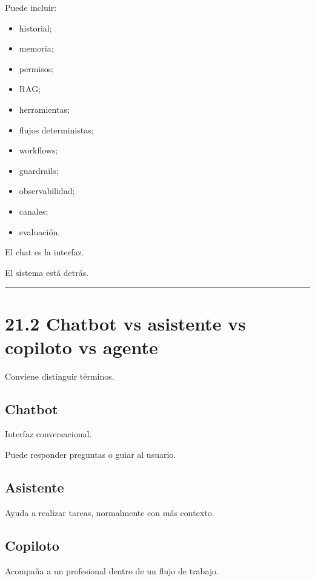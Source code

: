 Puede incluir:

\begin{itemize}
\tightlist
\item
  historial;
\item
  memoria;
\item
  permisos;
\item
  RAG;
\item
  herramientas;
\item
  flujos deterministas;
\item
  workflows;
\item
  guardrails;
\item
  observabilidad;
\item
  canales;
\item
  evaluación.
\end{itemize}

El chat es la interfaz.

El sistema está detrás.

\begin{center}\rule{0.5\linewidth}{0.5pt}\end{center}

\section{21.2 Chatbot vs asistente vs copiloto vs
agente}\label{chatbot-vs-asistente-vs-copiloto-vs-agente}

Conviene distinguir términos.

\subsection{Chatbot}\label{chatbot}

Interfaz conversacional.

Puede responder preguntas o guiar al usuario.

\subsection{Asistente}\label{asistente}

Ayuda a realizar tareas, normalmente con más contexto.

\subsection{Copiloto}\label{copiloto}

Acompaña a un profesional dentro de un flujo de trabajo.

